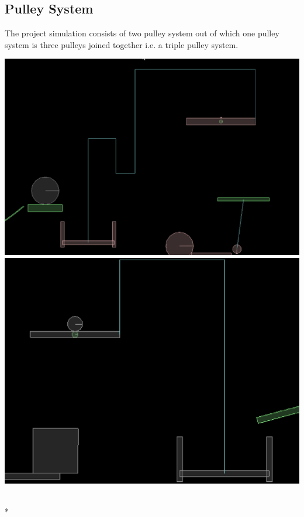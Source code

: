 \documentclass[11pt]{article}
\begin{document}
\subsection{Pulley System}
The project simulation consists of two pulley system out of which one pulley system is three pulleys joined together i.e. a triple pulley system.
\begin{center}
\includegraphics[scale=0.5]{pulley1}
\includegraphics[scale=0.5]{pulley2}
\end{center}
\\*
\end{document}
